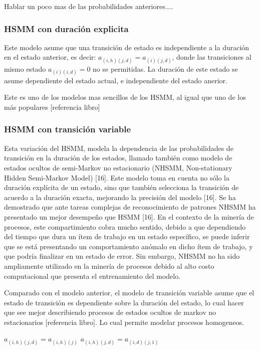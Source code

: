 Hablar un poco mas de las probabilidades anteriores....


\setcounter{secnumdepth}{4}
\subsubsection{HSMM con duración explicita }

Este modelo asume que una transición de estado es independiente a la duración en el estado anterior, es decir: $a_{(i,h)(j,d)} = a_{(i)(j,d)}$, donde las transiciones al mismo estado $a_{(i)(i,d)} = 0$ no se permitidas. La duración de este estado se asume dependiente del estado actual, e independiente del estado anerior.

Este es uno de los modelos mas sencillos de los HSMM, al igual que uno de los más populares [referencia libro]

\subsubsection{HSMM con transición variable }

Esta variación del HSMM, modela la dependencia de las probabilidades de transición en la duración de los estados, llamado también como modelo de estados ocultos de semi-Markov no estacionario (NHSMM, Non-stationary Hidden Semi-Markov Model) [16]. Este modelo toma en cuenta no sólo la duración explícita de un estado, sino que también selecciona la transición de acuerdo a la duración exacta, mejorando la precisión del modelo [16]. Se ha demostrado que ante tareas complejas de reconocimiento de patrones NHSMM ha presentado un mejor desempeño que HSMM [16]. En el contexto de la minería de procesos, este compartimiento cobra mucho sentido, debido a que dependiendo del tiempo que dura un ítem de trabajo en un estado específico, se puede inferir que se está presentando un comportamiento anómalo en dicho ítem de trabajo, y que podría finalizar en un estado de error. Sin embargo, NHSMM no ha sido ampliamente utilizado en la minería de procesos debido al alto costo computacional que presenta el entrenamiento del modelo.

Comparado con el modelo anterior, el modelo de transición variable asume que el estado de transición es dependiente sobre la duración del estado, lo cual hacer que see mejor describiendo procesos de estados ocultos de markov no estacionarios [referencia libro]. Lo cual permite modelar procesos homogeneos.

$a_{(i,h)(j,d)} = a_{(i,h)(j)}$
$a_{(i,h)(j,d)} = a_{(i,d)(j,1)}$

